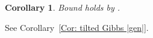 \documentclass{article}
\newtheorem{corollary}{Corollary}
\begin{document}
\begin{corollary}\label{Cor: tilted   Gibbs |gen|}
Bound holds by \citep{k1,
  k2}.
\end{corollary}
See Corollary~\ref{Cor: tilted  Gibbs |gen|}.


\end{document}
